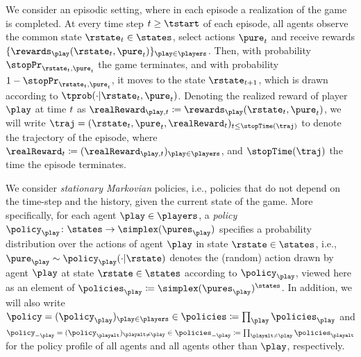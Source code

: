  We consider an episodic setting, where in each episode a realization of the game is completed. At every time step $\time \ge \tstart$ of each episode, 
all agents observe the common state $\rstate_{\time} \in \states$, select actions $\pure_{\time}$ and receive rewards $\{\rewards_{\play}(\rstate_\time,\pure_\time)\}_{\play \in \players}$. Then, with probability $\stopPr_{\rstate_\time,\pure_\time}$ the game terminates, and with probability $1-\stopPr_{\rstate_\time,\pure_\time}$, it moves to the state $\rstate_{\time+1}$, which is drawn according to $\tprob( \cdot | \rstate_{\time}, \pure_{\time})$. %
Denoting the realized reward of player $\play$ at time $t$ as $\realReward_{\play,\time} \defeq \rewards_{\play}(\rstate_{\time}, \pure_{\time})$, we will write $\traj = (\rstate_{\time}, \pure_{\time}, \realReward_{\time})_{\time \leq\stopTime(\traj)}$ to denote the trajectory of the episode, where $\realReward_{\time} \defeq (\realReward_{\play,\time})_{ \play \in \players}$, and $\stopTime(\traj)$ the time the episode terminates. 


We consider \emph{stationary Markovian} policies, i.e., policies that do not depend on the time-step and the history, given the current state of the game. More specifically, for each agent $\play \in \players$, a \emph{policy} $\policy_{\play} \from \states \to \simplex(\pures_{\play})$ specifies a probability distribution over the actions of agent $\play$ in state $\rstate \in \states$, i.e., $\pure_{\play} \sim \policy_{\play}\parens{\cdot \vert \rstate}$ denotes the (random) action drawn by agent $\play$ at state $\rstate \in \states$ according to $\policy_{\play}$, viewed here as an element of $\policies_{\play} \defeq \simplex(\pures_{\play})^{\states}$.
In addition, we will also write
$\policy = (\policy_{\play})_{\play \in \players} \in \policies \defeq \prod_{\play} \policies_{\play}$
and
$\policy_{-\play} = (\policy_\playalt)_{\playalt\neq\play} \in \policies_{-\play} \defeq \prod_{\playalt\neq\play} \policies_{\playalt}$ for the policy profile of all agents and all agents other than $\play$, respectively.

